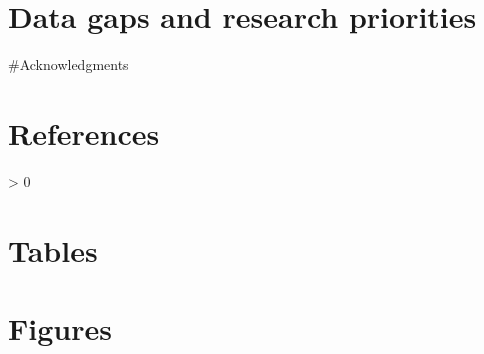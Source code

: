 \documentclass[11pt,
  english,
  a4paper,
]{article}
\newlength{\cslhangindent}
\newenvironment{CSLReferences}[2] %
 {%
  \setlength{\parindent}{0pt}
  \ifodd #1 \everypar{\setlength{\hangindent}{\cslhangindent}}\ignorespaces\fi
  \ifnum #2 > 0
  \setlength{\parskip}{#2\baselineskip}
  \fi
 }%
 {}
\begin{document}
\leavevmode\tagmcend\tagstructend


\hypertarget{data-gaps-and-research-priorities}{%
\section{Data gaps and research priorities}\label{data-gaps-and-research-priorities}}

\leavevmode\tagmcend\tagstructend


\#Acknowledgments

\leavevmode\tagmcend\tagstructend\par


\hypertarget{references}{%
\section{References}\label{references}}

\leavevmode\tagmcend\tagstructend


\hypertarget{refs}{}
\begin{CSLReferences}{0}{0}
\end{CSLReferences}

\leavevmode\tagmcend\tagstructend


\hypertarget{tables}{%
\section{Tables}\label{tables}}

\leavevmode\tagmcend\tagstructend


\hypertarget{figures}{%
\section{Figures}\label{figures}}

\leavevmode\tagmcend\tagstructend

\end{document}
